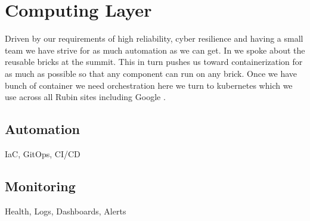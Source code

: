 \section{Computing Layer} \label{sec:computing}

Driven by our requirements of high reliability, cyber resilience and having a small team we have strive for as much automation as we can get.
In  we spoke about the reusable bricks at the summit.
This in turn pushes us toward containerization for as much as possible so that any component can run on any brick.
Once we have  bunch of container we need orchestration here we turn to kubernetes which we use across all Rubin sites including Google \citep{2021arXiv211115030O}.


\subsection{Automation}
IaC, GitOps, CI/CD

\subsection{Monitoring}
Health, Logs, Dashboards, Alerts

